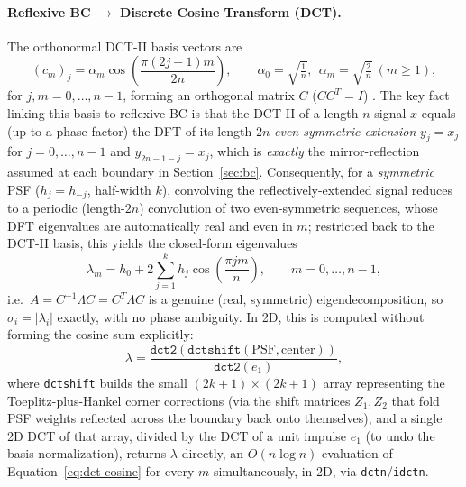 \documentclass[12pt, a4paper, onecolumn]{article}
\theoremstyle{plain}          %
\theoremstyle{definition}     %
\theoremstyle{remark}
\begin{document}
\paragraph{Reflexive BC $\to$ Discrete Cosine Transform (DCT).} The orthonormal DCT-II basis vectors
are
\begin{equation}
    (c_m)_j = \alpha_m\cos\!\left(\frac{\pi(2j+1)m}{2n}\right),
    \qquad \alpha_0=\sqrt{\tfrac1n},\ \ \alpha_m=\sqrt{\tfrac2n}\ (m\ge1),
    \label{eq:dct-basis}
\end{equation}
for $j,m=0,\dots,n-1$, forming an orthogonal matrix $C$
($CC^T=I$) \cite{strang1999}. The key fact linking this basis to reflexive
BC is that the DCT-II of a length-$n$ signal $x$ equals (up to a phase
factor) the DFT of its length-$2n$ \emph{even-symmetric extension}
$y_j = x_j$ for $j=0,\dots,n-1$ and $y_{2n-1-j}=x_j$, which is
\emph{exactly} the mirror-reflection assumed at each boundary in
Section~\ref{sec:bc}. Consequently, for a \emph{symmetric} PSF
($h_j=h_{-j}$, half-width $k$), convolving the reflectively-extended
signal reduces to a periodic (length-$2n$) convolution of two
even-symmetric sequences, whose DFT eigenvalues are automatically real and
even in $m$; restricted back to the DCT-II basis, this yields the
closed-form eigenvalues \cite{ngchantang1999}
\begin{equation}
    \lambda_m = h_0 + 2\sum_{j=1}^{k} h_j\cos\!\left(\frac{\pi jm}{n}\right),
    \qquad m=0,\dots,n-1,
    \label{eq:dct-cosine}
\end{equation}
i.e.\ $A = C^{-1}\Lambda C = C^T\Lambda C$ is a genuine (real, symmetric)
eigendecomposition, so $\sigma_i=|\lambda_i|$ exactly, with no phase
ambiguity. In 2D, this is computed without forming the cosine sum
explicitly:
\begin{equation}
    \lambda = \frac{\texttt{dct2}(\texttt{dctshift}(\text{PSF},\text{center}))}
    {\texttt{dct2}(e_1)},
    \label{eq:dct-eig}
\end{equation}
where \texttt{dctshift} builds the small $(2k+1)\times(2k+1)$ array
representing the Toeplitz-plus-Hankel corner corrections (via the shift
matrices $Z_1,Z_2$ that fold PSF weights reflected across the boundary
back onto themselves), and a single 2D DCT of that array, divided by the
DCT of a unit impulse $e_1$ (to undo the basis normalization), returns
$\lambda$ directly, an $O(n\log n)$ evaluation of
Equation~\eqref{eq:dct-cosine} for every $m$ simultaneously, in 2D, via
\texttt{dctn}/\texttt{idctn}.
 
\end{document}
